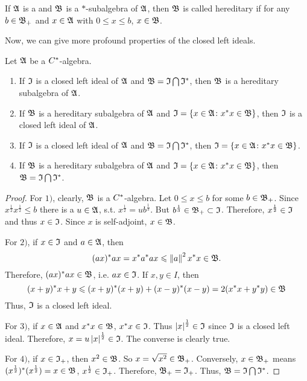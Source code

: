 \documentclass[a4paper,11pt]{report}
\begin{document}
\begin{defn}
	If $\mathfrak{A}$ is a \Cs and $\mathfrak{B}$ is a $*$-subalgebra of $\mathfrak{A}$, then $\mathfrak{B}$ is called hereditary if for any $b \in \mathfrak{B}_{+}$ and $x \in \mathfrak{A}$ with $0 \leqslant x \leqslant b$, $x \in \mathfrak{B}$.
\end{defn}

Now, we can give more profound properties of the closed left ideals.

\begin{thm} \label{thm6}
	Let $\mathfrak{A}$ be a $C^{*}$-algebra.
	\begin{enumerate}[label=\arabic*)]
		\item If $\mathfrak{I}$ is a closed left ideal of $\mathfrak{A}$ and $\mathfrak{B} = \mathfrak{I} \bigcap \mathfrak{I}^{*}$, then $\mathfrak{B}$ is a hereditary subalgebra of $\mathfrak{A}$.
		\item If $\mathfrak{B}$ is a hereditary subalgebra of $\mathfrak{A}$ and $\mathfrak{I} = \{x\in \mathfrak{A} \colon x^{*}x \in \mathfrak{B}\}$, then $\mathfrak{I}$ is a closed left ideal of $\mathfrak{A}$.
		\item If $\mathfrak{I}$ is a closed left ideal of $\mathfrak{A}$ and $\mathfrak{B} = \mathfrak{I} \bigcap \mathfrak{I}^{*}$, then $\mathfrak{I} = \{x\in \mathfrak{A} \colon x^{*}x \in \mathfrak{B}\}$.
		\item If $\mathfrak{B}$ is a hereditary subalgebra of $\mathfrak{A}$ and $\mathfrak{I} = \{x\in \mathfrak{A} \colon x^{*}x \in \mathfrak{B}\}$, then $\mathfrak{B} = \mathfrak{I} \bigcap \mathfrak{I}^{*}$.
	\end{enumerate}
\end{thm}
\begin{proof}
	For $1)$, clearly, $\mathfrak{B}$ is a $C^{*}$-algebra. Let $0 \leqslant x \leqslant b$ for some $b \in \mathfrak{B}_{+}$. Since $x^{\frac{1}{2}}x^{\frac{1}{2}} \leqslant b$ there is a $u \in \mathfrak{A}$, s.t. $x^{\frac{1}{2}} = u b^{\frac{1}{3}}$. But $b^{\frac{1}{3}} \in \mathfrak{B}_{+} \subset \mathfrak{I}$. Therefore, $x^{\frac{1}{2}} \in \mathfrak{I}$ and thus $x \in \mathfrak{I}$. Since $x$ is self-adjoint, $x \in \mathfrak{B}$.
	\item For $2)$, if $x \in \mathfrak{I}$ and $a \in \mathfrak{A}$, then 
	\begin{equation*}
		(ax)^{*}ax = x^{*}a^{*}ax \leqslant \left\lVert a\right\lVert^2 x^{*}x \in \mathfrak{B}.
	\end{equation*}
	Therefore, $(ax)^{*}ax \in \mathfrak{B}$, i.e. $ax \in \mathfrak{I}$. If $x,y \in I$, then 
	\begin{equation*}
		(x+y)^{*}x+y \leqslant (x+y)^{*}(x+y)+(x-y)^{*}(x-y) = 2 (x^{*}x+y^{*}y) \in \mathfrak{B}
	\end{equation*}
	Thus, $\mathfrak{I}$ is a closed left ideal.
	\item For $3)$, if $x \in \mathfrak{A}$ and $x^{*}x \in \mathfrak{B}$, $x^{*}x \in \mathfrak{I}$. Thus $\left\lvert x\right\lvert^{\frac{1}{2}} \in \mathfrak{I}$ since $\mathfrak{I}$ is a closed left ideal. Therefore, $x = u \left\lvert x\right\lvert^{\frac{1}{2}} \in \mathfrak{I}$. The converse is clearly true.
	\item For $4)$, if $x \in \mathfrak{I}_{+}$, then $x^2 \in \mathfrak{B}$. So $x = \sqrt{x^2} \in \mathfrak{B}_{+}$. Conversely, $x \in \mathfrak{B}_{+}$ means $(x^{\frac{1}{2}})^{*}(x^{\frac{1}{2}}) = x \in \mathfrak{B}$, $x^{\frac{1}{2}} \in \mathfrak{I}_{+}$. Therefore, $\mathfrak{B}_{+} = \mathfrak{I}_{+}$. Thus, $\mathfrak{B} = \mathfrak{I} \bigcap \mathfrak{I}^{*}$. 
\end{proof}
\end{document}
